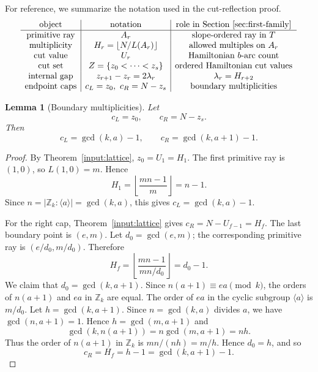 \documentclass[11pt]{article}
\newtheorem{lemma}[theorem]{Lemma}
\newcommand{\Z}{\mathbb Z}
\begin{document}
For reference, we summarize the notation used in the cut-reflection proof.
\[
\begin{array}{c|c|c}
\text{object} & \text{notation} & \text{role in Section~\ref{sec:first-family}}\\
\hline
\text{primitive ray} & A_r & \text{slope-ordered ray in }T\\
\text{multiplicity} & H_r=\lfloor N/L(A_r)\rfloor & \text{allowed multiples on }A_r\\
\text{cut value} & U_r & \text{Hamiltonian }b\text{-arc count}\\
\text{cut set} & Z=\{z_0<\cdots<z_s\} & \text{ordered Hamiltonian cut values}\\
\text{internal gap} & z_{r+1}-z_r=2\lambda_r & \lambda_r=H_{r+2}\\
\text{endpoint caps} & c_L=z_0,\ c_R=N-z_s & \text{boundary multiplicities}
\end{array}
\]

\begin{lemma}[Boundary multiplicities]\label{lem:endpoint-caps}
Let
\[
        c_L=z_0,
        \qquad
        c_R=N-z_s.
\]
Then
\[
        c_L=\gcd(k,a)-1,
        \qquad
        c_R=\gcd(k,a+1)-1.
\]
\end{lemma}

\begin{proof}
By Theorem~\ref{input:lattice}, $z_0=U_1=H_1$.  The first primitive ray is $(1,0)$, so $L(1,0)=m$.  Hence
\[
        H_1=\left\lfloor\frac{mn-1}{m}\right\rfloor=n-1.
\]
Since $n=|\Z_k:\langle a\rangle|=\gcd(k,a)$, this gives $c_L=\gcd(k,a)-1$.

For the right cap, Theorem~\ref{input:lattice} gives $c_R=N-U_{f-1}=H_f$.  The last boundary point is $(e,m)$.  Let $d_0=\gcd(e,m)$; the corresponding primitive ray is $(e/d_0,m/d_0)$.  Therefore
\[
        H_f=\left\lfloor \frac{mn-1}{mn/d_0}\right\rfloor=d_0-1.
\]
We claim that $d_0=\gcd(k,a+1)$.  Since $n(a+1)\equiv ea\pmod{k}$, the orders of $n(a+1)$ and $ea$ in $\Z_k$ are equal.  The order of $ea$ in the cyclic subgroup $\langle a\rangle$ is $m/d_0$.  Let $h=\gcd(k,a+1)$.  Since $n=\gcd(k,a)$ divides $a$, we have $\gcd(n,a+1)=1$.  Hence $h=\gcd(m,a+1)$ and
\[
        \gcd(k,n(a+1))=n\gcd(m,a+1)=nh.
\]
Thus the order of $n(a+1)$ in $\Z_k$ is $mn/(nh)=m/h$.  Hence $d_0=h$, and so
\[
        c_R=H_f=h-1=\gcd(k,a+1)-1.
\]
\end{proof}
\end{document}
